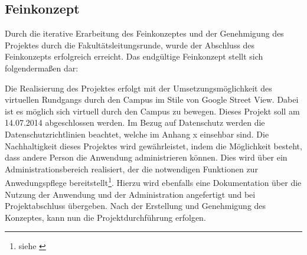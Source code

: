 \subsection{Feinkonzept}
\label{sec:Feinkonzept}

Durch die iterative Erarbeitung des Feinkonzeptes und der Genehmigung des Projektes durch die Fakultätsleitungsrunde, wurde der Abschluss des Feinkonzepts erfolgreich erreicht.
Das endgültige Feinkonzept stellt sich folgendermaßen dar:

Die Realisierung des Projektes erfolgt mit der Umsetzungsmöglichkeit des virtuellen Rundgangs durch den Campus im Stile von 
Google Street View. Dabei ist es möglich sich virtuell durch den Campus zu bewegen. Dieses Projekt soll am 14.07.2014 
abgeschlossen werden. Im Bezug auf Datenschutz werden die Datenschutzrichtlinien beachtet, welche im Anhang x einsehbar 
sind.
Die Nachhaltigkeit dieses Projektes wird gewährleistet, indem die Möglichkeit besteht, dass andere Person die Anwendung 
administrieren können. Dies wird über ein Administrationsbereich realisiert, der die 
notwendigen Funktionen zur Anwedungspflege 
bereitstellt\footnote{siehe \citet{lastenheft2013}}. Hierzu wird ebenfalls eine Dokumentation über die Nutzung der Anwendung und der 
Administration angefertigt und bei Projektabschluss übergeben.
Nach der Erstellung und Genehmigung des Konzeptes, kann nun die Projektdurchführung erfolgen.